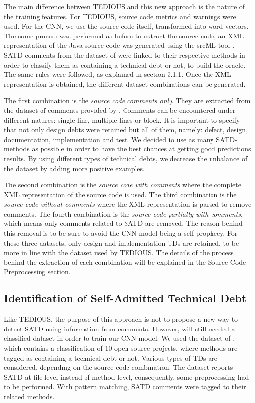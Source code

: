 
The main difference between TEDIOUS and this new approach is the nature of the training features. For TEDIOUS, source code metrics and warnings were used. For the CNN, we use the source code itself, transformed into word vectors. The same process was performed as before to extract the source code, an XML representation of the Java source code was generated using the srcML tool \citep{Collard2013}. SATD comments from the dataset of \citet{MaldonadoNLP} were linked to their respective methods in order to classify them as containing a technical debt or not, to build the oracle. The same rules were followed, as explained in section 3.1.1. Once the XML representation is obtained, the different dataset combinations can be generated.

The first combination is the \textit{source code comments only}. They are extracted from the dataset of comments provided by \citet{maldonado17}. Comments can be encountered under different natures: single line, multiple lines or block. It is important to specify that not only design debts were retained but all of them, namely: defect, design, documentation, implementation and test. We decided to use as many SATD-methods as possible in order to have the best chances at getting good predictions results. By using different types of technical debts, we decrease the unbalance of the dataset by adding more positive examples.

The second combination is the \textit{source code with comments} where the complete XML representation of the source code is used. The third combination is the \textit{source code without comments} where the XML representation is parsed to remove comments. The fourth combination is the \textit{source code partially with comments}, which means only comments related to SATD are removed. The reason behind this removal is to be sure to avoid the CNN model being a self-prophecy. For these three datasets, only design and implementation TDs are retained, to be more in line with the dataset used by TEDIOUS. The details of the process behind the extraction of each combination will be explained in the Source Code Preprocessing section.

\subsection{Identification of Self-Admitted Technical Debt}


Like TEDIOUS, the purpose of this approach is not to propose a new way to detect SATD using information from comments. However, will still needed a classified dataset in order to train our CNN model. We used the dataset of \citet{maldonado17}, which contains a classification of 10 open source projects, where methods are tagged as containing a technical debt or not. Various types of TDs are considered, depending on the source code combination. The dataset reports SATD at file-level instead of method-level, consequently, some preprocessing had to be performed. With pattern matching, SATD comments were tagged to their related methods.

